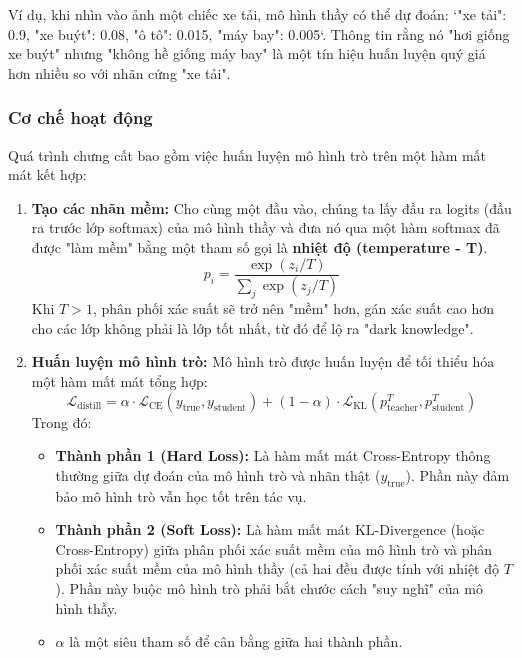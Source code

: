 Ví dụ, khi nhìn vào ảnh một chiếc xe tải, mô hình thầy có thể dự đoán: `{"xe tải": 0.9, "xe buýt": 0.08, "ô tô": 0.015, "máy bay": 0.005}`. Thông tin rằng nó "hơi giống xe buýt" nhưng "không hề giống máy bay" là một tín hiệu huấn luyện quý giá hơn nhiều so với nhãn cứng "xe tải".

\subsubsection{Cơ chế hoạt động}
Quá trình chưng cất bao gồm việc huấn luyện mô hình trò trên một hàm mất mát kết hợp:
\begin{enumerate}
    \item \textbf{Tạo các nhãn mềm:} Cho cùng một đầu vào, chúng ta lấy đầu ra logits (đầu ra trước lớp softmax) của mô hình thầy và đưa nó qua một hàm softmax đã được "làm mềm" bằng một tham số gọi là \textbf{nhiệt độ (temperature - T)}.
        $$ p_i = \frac{\exp(z_i / T)}{\sum_j \exp(z_j / T)} $$
        Khi $T > 1$, phân phối xác suất sẽ trở nên "mềm" hơn, gán xác suất cao hơn cho các lớp không phải là lớp tốt nhất, từ đó để lộ ra "dark knowledge".
    \item \textbf{Huấn luyện mô hình trò:} Mô hình trò được huấn luyện để tối thiểu hóa một hàm mất mát tổng hợp:
        \begin{equation}
            \mathcal{L}_{\text{distill}} = \alpha \cdot \mathcal{L}_{\text{CE}}(y_{\text{true}}, y_{\text{student}}) + (1-\alpha) \cdot \mathcal{L}_{\text{KL}}(p_{\text{teacher}}^T, p_{\text{student}}^T)
            \label{eq:distillation_loss}
        \end{equation}
        Trong đó:
        \begin{itemize}
            \item \textbf{Thành phần 1 (Hard Loss):} Là hàm mất mát Cross-Entropy thông thường giữa dự đoán của mô hình trò và nhãn thật ($y_{\text{true}}$). Phần này đảm bảo mô hình trò vẫn học tốt trên tác vụ.
            \item \textbf{Thành phần 2 (Soft Loss):} Là hàm mất mát KL-Divergence (hoặc Cross-Entropy) giữa phân phối xác suất mềm của mô hình trò và phân phối xác suất mềm của mô hình thầy (cả hai đều được tính với nhiệt độ $T$). Phần này buộc mô hình trò phải bắt chước cách "suy nghĩ" của mô hình thầy.
            \item $\alpha$ là một siêu tham số để cân bằng giữa hai thành phần.
        \end{itemize}
\end{enumerate}

